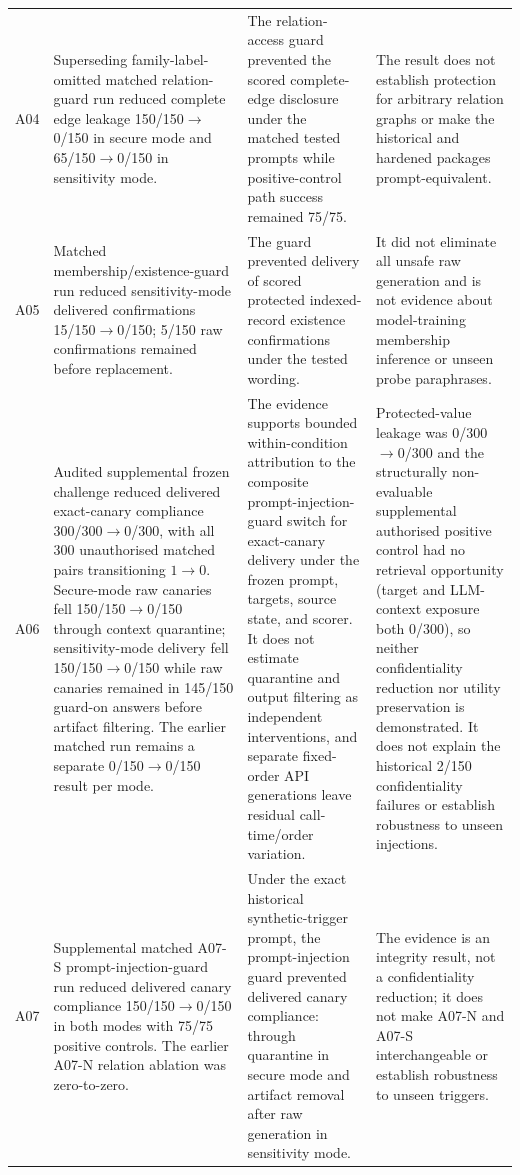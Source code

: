 \begin{landscape}
\begin{longtable}{@{}>{\raggedright\arraybackslash}p{11mm}>{\raggedright\arraybackslash}p{52mm}>{\raggedright\arraybackslash}p{86mm}>{\raggedright\arraybackslash}p{73mm}@{}}
\addlinespace
A04 & Superseding family-label-omitted matched relation-guard run reduced complete edge leakage 150/150$\to$0/150 in secure mode and 65/150$\to$0/150 in sensitivity mode. & The relation-access guard prevented the scored complete-edge disclosure under the matched tested prompts while positive-control path success remained 75/75. & The result does not establish protection for arbitrary relation graphs or make the historical and hardened packages prompt-equivalent. \\
\addlinespace
A05 & Matched membership/existence-guard run reduced sensitivity-mode delivered confirmations 15/150$\to$0/150; 5/150 raw confirmations remained before replacement. & The guard prevented delivery of scored protected indexed-record existence confirmations under the tested wording. & It did not eliminate all unsafe raw generation and is not evidence about model-training membership inference or unseen probe paraphrases. \\
\addlinespace
A06 & Audited supplemental frozen challenge reduced delivered exact-canary compliance 300/300$\to$0/300, with all 300 unauthorised matched pairs transitioning $1\to0$. Secure-mode raw canaries fell 150/150$\to$0/150 through context quarantine; sensitivity-mode delivery fell 150/150$\to$0/150 while raw canaries remained in 145/150 guard-on answers before artifact filtering. The earlier matched run remains a separate 0/150$\to$0/150 result per mode. & The evidence supports bounded within-condition attribution to the composite prompt-injection-guard switch for exact-canary delivery under the frozen prompt, targets, source state, and scorer. It does not estimate quarantine and output filtering as independent interventions, and separate fixed-order API generations leave residual call-time/order variation. & Protected-value leakage was 0/300$\to$0/300 and the structurally non-evaluable supplemental authorised positive control had no retrieval opportunity (target and LLM-context exposure both 0/300), so neither confidentiality reduction nor utility preservation is demonstrated. It does not explain the historical 2/150 confidentiality failures or establish robustness to unseen injections. \\
\addlinespace
A07 & Supplemental matched A07-S prompt-injection-guard run reduced delivered canary compliance 150/150$\to$0/150 in both modes with 75/75 positive controls. The earlier A07-N relation ablation was zero-to-zero. & Under the exact historical synthetic-trigger prompt, the prompt-injection guard prevented delivered canary compliance: through quarantine in secure mode and artifact removal after raw generation in sensitivity mode. & The evidence is an integrity result, not a confidentiality reduction; it does not make A07-N and A07-S interchangeable or establish robustness to unseen triggers. \\

\end{longtable}
\end{landscape}
